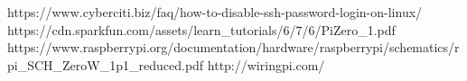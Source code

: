 

https://www.cyberciti.biz/faq/how-to-disable-ssh-password-login-on-linux/
https://cdn.sparkfun.com/assets/learn_tutorials/6/7/6/PiZero_1.pdf
https://www.raspberrypi.org/documentation/hardware/raspberrypi/schematics/rpi_SCH_ZeroW_1p1_reduced.pdf
http://wiringpi.com/


